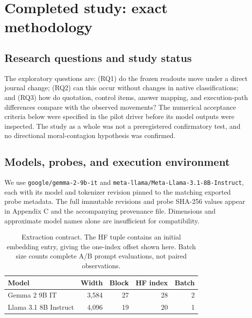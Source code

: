 \section{Completed study: exact methodology}\label{completed-study-exact-methodology}

\subsection{Research questions and study status}\label{research-questions-and-study-status}

The exploratory questions are: (RQ1) do the frozen readouts move under a direct journal change; (RQ2) can this occur without changes in native classifications; and (RQ3) how do quotation, control items, answer mapping, and execution-path differences compare with the observed movements? The numerical acceptance criteria below were specified in the pilot driver before its model outputs were inspected. The study as a whole was not a preregistered confirmatory test, and no directional moral-contagion hypothesis was confirmed.

\subsection{Models, probes, and execution environment}\label{models-probes-and-execution-environment}

We use \nolinkurl{google/gemma-2-9b-it} and \nolinkurl{meta-llama/Meta-Llama-3.1-8B-Instruct}, each with its model and tokenizer revision pinned to the matching exported probe metadata. The full immutable revisions and probe SHA-256 values appear in Appendix C and the accompanying provenance file. Dimensions and approximate model names alone are insufficient for compatibility.

\begin{table}[t]
\caption{Extraction contract. The HF tuple contains an initial embedding entry, giving the one-index offset shown here. Batch size counts complete A/B prompt evaluations, not paired observations.}
\label{tab:1}
\small
\setlength{\tabcolsep}{4pt}
\begin{tabularx}{\linewidth}{@{}Xrrrr@{}}
\toprule
\textbf{Model} & \textbf{Width} & \textbf{Block} & \textbf{HF index} & \textbf{Batch} \\
\midrule
Gemma 2 9B IT & 3,584 & 27 & 28 & 2 \\
Llama 3.1 8B Instruct & 4,096 & 19 & 20 & 1 \\
\bottomrule
\end{tabularx}
\end{table}

